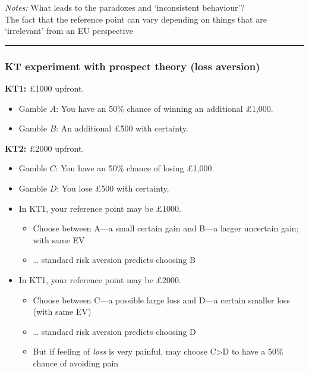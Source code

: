 \documentclass[]{article}
\providecommand{\tightlist}{%
  \setlength{\itemsep}{0pt}\setlength{\parskip}{0pt}}
\begin{document}
\emph{Notes:}
What leads to the paradoxes and `inconsistent behaviour'?\\
The fact that the reference point can vary depending on things that are `irrelevant' from an EU perspective

\begin{center}\rule{0.5\linewidth}{\linethickness}\end{center}

\hypertarget{kt-experiment-with-prospect-theory-loss-aversion}{%
\subsubsection{KT experiment with prospect theory (loss aversion)}\label{kt-experiment-with-prospect-theory-loss-aversion}}

\textbf{KT1:} \pounds1000 upfront.\\

\begin{itemize}
\tightlist
\item
  Gamble \(A\): You have an 50\% chance of winning an additional \pounds1,000.
\item
  Gamble \(B\): An additional \pounds500 with certainty.
\end{itemize}

\bigskip

\hrulefill

\textbf{KT2:} \pounds2000 upfront.\\

\begin{itemize}
\tightlist
\item
  Gamble \(C\): You have an 50\% chance of losing \pounds1,000.
\item
  Gamble \(D\): You lose \pounds500 with certainty.
\end{itemize}

\hrulefill

\bigskip

\begin{itemize}
\tightlist
\item
  In KT1, your reference point may be \pounds1000.

  \begin{itemize}
  \tightlist
  \item
    Choose between A---a small certain gain and B---a larger uncertain gain; with same EV
  \item
    \ldots{} standard risk aversion predicts choosing B
  \end{itemize}
\item
  In KT1, your reference point may be \pounds2000.

  \begin{itemize}
  \tightlist
  \item
    Choose between C---a possible large loss and D---a certain smaller loss (with same EV)
  \item
    \ldots{} standard risk aversion predicts choosing D
  \item
    But if feeling of \emph{loss} is very painful, may choose C\textgreater{}D to have a 50\% chance of avoiding pain
  \end{itemize}
\end{itemize}
\end{document}
